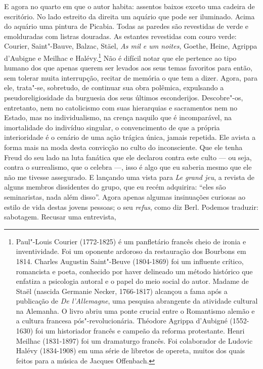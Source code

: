 E agora no quarto em que o autor habita: assentos baixos exceto uma
cadeira de escritório. No lado estreito da direita um aquário que pode
ser iluminado. Acima do aquário uma pintura de Picabia. Todas as paredes
são revestidas de verde e emolduradas com listras douradas. As estantes
revestidas com couro verde: Courier, Saint"-Bauve, Balzac, Stäel,
\emph{As mil e um noites}, Goethe, Heine, Agrippa d'Aubigne e Meilhac e
Halévy.\footnote{Paul"-Louis Courier (1772-1825) é um panfletário
  francês cheio de ironia e inventividade. Foi um oponente ardoroso da
  restauração dos Bourbons em 1814. Charles Augustin Saint"-Beuve
  (1804-1869) foi um influente crítico, romancista e poeta, conhecido
  por haver delineado um método histórico que enfatiza a psicologia
  autoral e o papel do meio social do autor. Madame de Staël (nascida
  Germanie Necker, 1766-1817) alcançou a fama após a publicação de
  \emph{De l'Allemagne}, uma pesquisa abrangente da atividade cultural
  na Alemanha. O livro abriu uma ponte crucial entre o Romantismo alemão
  e a cultura francesa pós"-revolucionária. Théodore Agrippa d'Aubigné
  (1552-1630) foi um historiador francês e campeão da reforma
  protestante. Henri Meilhac (1831-1897) foi um dramaturgo francês. Foi
  colaborador de Ludovic Halévy (1834-1908) em uma série de libretos de
  opereta, muitos dos quais feitos para a música de Jacques Offenbach. \versal{[N. E.]}}
Não é difícil notar que ele pertence ao tipo humano dos que apenas
querem ser levados aos seus temas favoritos para então, sem tolerar
muita interrupção, recitar de memória o que tem a dizer. Agora, para
ele, trata"-se, sobretudo, de continuar sua obra polêmica, expulsando a
pseudoreligiosidade da burguesia dos seus últimos esconderijos.
Descobre"-os, entretanto, nem no catolicismo com suas hierarquias e
sacramentos nem no Estado, mas no individualismo, na crença naquilo que
é incomparável, na imortalidade do indivíduo singular, o convencimento
de que a própria interioridade é o cenário de uma ação trágica única,
jamais repetida. Ele avista a forma mais na moda desta convicção no
culto do inconsciente. Que ele tenha Freud do seu lado na luta fanática
que ele declarou contra este culto --- ou seja, contra o surrealismo, que
o celebra ---, isso é algo que eu saberia mesmo que ele não me tivesse
assegurado. E lançando uma vista para \emph{Le grand jeu}, a revista de
alguns membros dissidentes do grupo, que eu recém adquirira: ``eles são
seminaristas, nada além disso''. Agora apenas algumas insinuações
curiosas ao estilo de vida destas jovens pessoas; o seu \emph{refus},
como diz Berl. Podemos traduzir: sabotagem. Recusar uma entrevista,
